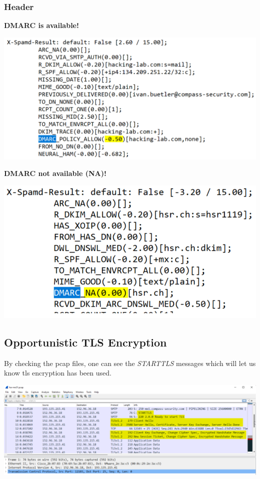 \subsubsection{Header}
\textbf{DMARC is available!}
\begin{center}
    \vspace{-8pt}
    \includegraphics[width=1.0\linewidth]{./img/07-mail_security/dmarc}
    \vspace{-8pt}
\end{center}
\textbf{DMARC not available (NA)!}
\begin{center}
    \vspace{-8pt}
    \includegraphics[width=1.0\linewidth]{./img/07-mail_security/dmarc2}
    \vspace{-8pt}
\end{center}


\subsection{Opportunistic TLS Encryption}
By checking the pcap files, one can see the \textit{STARTTLS} messages which will let us know tls encryption has been used.

\begin{center}
   \includegraphics[width=1.0\linewidth]{./img/07-mail_security/tls_encryption}
\end{center}


